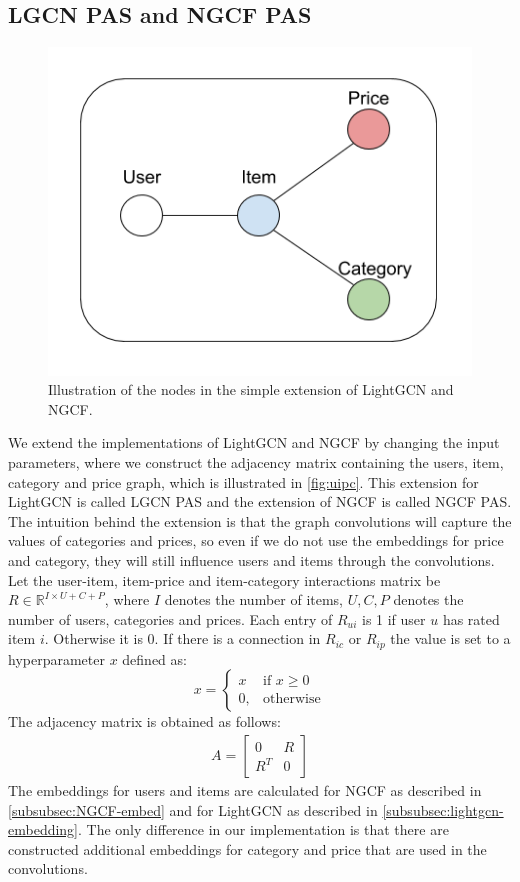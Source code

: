 \subsection{LGCN PAS and NGCF PAS}\label{subsec:simple-extension}
\begin{figure}
    \centering
    \includegraphics[scale=0.5]{figures/uipc.png}
    \caption{Illustration of the nodes in the simple extension of LightGCN and NGCF.}
    \label{fig:uipc}
\end{figure}
We extend the implementations of LightGCN and NGCF by changing the input parameters, where we construct the adjacency matrix containing the users, item, category and price graph, which is illustrated in \autoref{fig:uipc}.
This extension for LightGCN is called LGCN PAS and the extension of NGCF is called NGCF PAS.
The intuition behind the extension is that the graph convolutions will capture the values of categories and prices, so even if we do not use the embeddings for price and category, they will still influence users and items through the convolutions.
Let the user-item, item-price and item-category interactions matrix be $R \in \mathbb{R}^{I \times U + C + P}$, where $I$ denotes the number of items, $U, C, P$ denotes the number of users, categories and prices.
Each entry of $R_{ui}$ is 1 if user $u$ has rated item $i$. Otherwise it is 0.
If there is a connection in $R_{ic}$ or $R_{ip}$ the value is set to a hyperparameter $x$ defined as:
\[
    x= 
\begin{cases}
    x  & \text{if } x \geq 0\\
    0, & \text{otherwise}
\end{cases}
\]
The adjacency matrix is obtained as follows:
\begin{gather}
    A =
    \begin{bmatrix}
        0   & R \\
        R^T & 0
    \end{bmatrix}
\end{gather}
The embeddings for users and items are calculated for NGCF as described in \autoref{subsubsec:NGCF-embed} and for LightGCN as described in \autoref{subsubsec:lightgcn-embedding}.
The only difference in our implementation is that there are constructed additional embeddings for category and price that are used in the convolutions.
